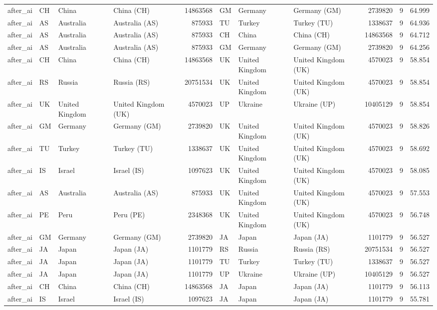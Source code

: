 \begin{tabular}{llllrlllrrr}
after\_ai & CH & China & China (CH) & 14863568 & GM & Germany & Germany (GM) & 2739820 & 9 & 64.999 \\
after\_ai & AS & Australia & Australia (AS) & 875933 & TU & Turkey & Turkey (TU) & 1338637 & 9 & 64.936 \\
after\_ai & AS & Australia & Australia (AS) & 875933 & CH & China & China (CH) & 14863568 & 9 & 64.712 \\
after\_ai & AS & Australia & Australia (AS) & 875933 & GM & Germany & Germany (GM) & 2739820 & 9 & 64.256 \\
after\_ai & CH & China & China (CH) & 14863568 & UK & United Kingdom & United Kingdom (UK) & 4570023 & 9 & 58.854 \\
after\_ai & RS & Russia & Russia (RS) & 20751534 & UK & United Kingdom & United Kingdom (UK) & 4570023 & 9 & 58.854 \\
after\_ai & UK & United Kingdom & United Kingdom (UK) & 4570023 & UP & Ukraine & Ukraine (UP) & 10405129 & 9 & 58.854 \\
after\_ai & GM & Germany & Germany (GM) & 2739820 & UK & United Kingdom & United Kingdom (UK) & 4570023 & 9 & 58.826 \\
after\_ai & TU & Turkey & Turkey (TU) & 1338637 & UK & United Kingdom & United Kingdom (UK) & 4570023 & 9 & 58.692 \\
after\_ai & IS & Israel & Israel (IS) & 1097623 & UK & United Kingdom & United Kingdom (UK) & 4570023 & 9 & 58.085 \\
after\_ai & AS & Australia & Australia (AS) & 875933 & UK & United Kingdom & United Kingdom (UK) & 4570023 & 9 & 57.553 \\
after\_ai & PE & Peru & Peru (PE) & 2348368 & UK & United Kingdom & United Kingdom (UK) & 4570023 & 9 & 56.748 \\
after\_ai & GM & Germany & Germany (GM) & 2739820 & JA & Japan & Japan (JA) & 1101779 & 9 & 56.527 \\
after\_ai & JA & Japan & Japan (JA) & 1101779 & RS & Russia & Russia (RS) & 20751534 & 9 & 56.527 \\
after\_ai & JA & Japan & Japan (JA) & 1101779 & TU & Turkey & Turkey (TU) & 1338637 & 9 & 56.527 \\
after\_ai & JA & Japan & Japan (JA) & 1101779 & UP & Ukraine & Ukraine (UP) & 10405129 & 9 & 56.527 \\
after\_ai & CH & China & China (CH) & 14863568 & JA & Japan & Japan (JA) & 1101779 & 9 & 56.113 \\
after\_ai & IS & Israel & Israel (IS) & 1097623 & JA & Japan & Japan (JA) & 1101779 & 9 & 55.781 \\

\end{tabular}
